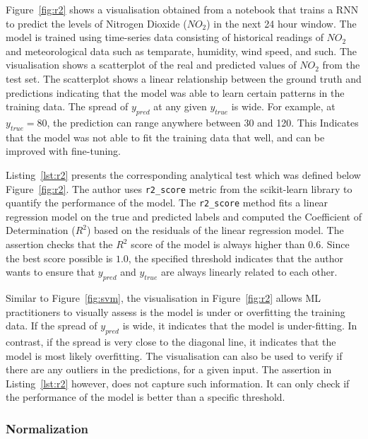 \documentclass[conference]{IEEEtran}
\begin{document}
Figure~\ref{fig:r2} shows a visualisation obtained from a notebook that trains a RNN to predict the levels of Nitrogen Dioxide ($NO_2$) in the next 24 hour window. The model is trained using time-series data consisting of historical readings of $NO_2$ and meteorological data such as temparate, humidity, wind speed, and such. The visualisation shows a scatterplot of the real and predicted values of $NO_2$ from the test set. The scatterplot shows a linear relationship between the ground truth and predictions indicating that the model was able to learn certain patterns in the training data. The spread of $y_{pred}$ at any given $y_{true}$ is wide. For example, at $y_{true} = 80$, the prediction can range anywhere between 30 and 120. This Indicates that the model was not able to fit the training data that well, and can be improved with fine-tuning.

Listing~\ref{lst:r2} presents the corresponding analytical test which was defined below Figure~\ref{fig:r2}. The author uses \texttt{r2\_score} metric from the scikit-learn library to quantify the performance of the model. The \texttt{r2\_score} method fits a linear regression model on the true and predicted labels and computed the Coefficient of Determination ($R^2$) based on the residuals of the linear regression model. The assertion checks that the $R^2$ score of the model is always higher than $0.6$. Since the best score possible is $1.0$, the specified threshold indicates that the author wants to ensure that $y_{pred}$ and $y_{true}$ are always linearly related to each other.

Similar to Figure~\ref{fig:svm}, the visualisation in Figure~\ref{fig:r2} allows ML practitioners to visually assess is the model is under or overfitting the training data. If the spread of $y_{pred}$ is wide, it indicates that the model is under-fitting. In contrast, if the spread is very close to the diagonal line, it indicates that the model is most likely overfitting. The visualisation can also be used to verify if there are any outliers in the predictions, for a given input. The assertion in Listing~\ref{lst:r2} however, does not capture such information. It can only check if the performance of the model is better than a specific threshold.

\subsubsection{Normalization}
\end{document}
